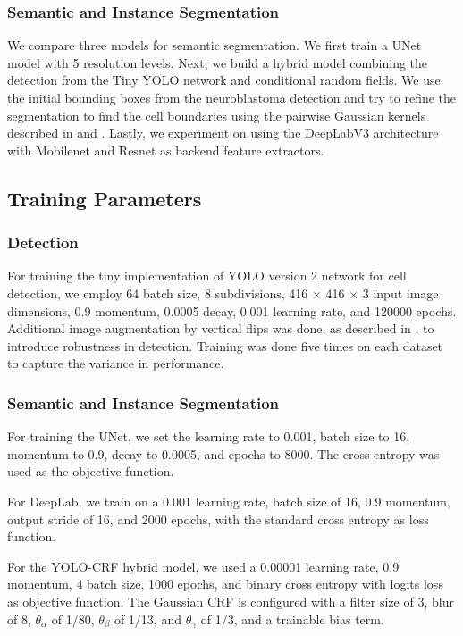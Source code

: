 \documentclass[journal]{IEEEtran}
\begin{document}
\subsubsection{Semantic and Instance Segmentation}
We compare three models for semantic segmentation. We first train a UNet model with 5 resolution levels. Next, we build a hybrid model combining the detection from the Tiny YOLO network and conditional random fields. We use the initial bounding boxes from the neuroblastoma detection and try to refine the segmentation to find the cell boundaries using the pairwise Gaussian kernels described in \cite{NIPS2011_4296} and \cite{Teichmann2018ConvolutionalCF}. Lastly, we experiment on using the DeepLabV3 architecture with Mobilenet and Resnet as backend feature extractors.
\subsection{Training Parameters}
\subsubsection{Detection}
For training the tiny implementation of YOLO version 2 network for cell detection, we employ 64 batch size, 8 subdivisions, 416 $\times$ 416 $\times$ 3 input image dimensions, 0.9 momentum, 0.0005 decay, 0.001 learning rate, and 120000 epochs. Additional image augmentation by vertical flips was done, as described in \cite{Waithe544833}, to introduce robustness in detection. Training was done five times on each dataset to capture the variance in performance.
\subsubsection{Semantic and Instance Segmentation}
For training the UNet, we set the learning rate to 0.001, batch size to 16, momentum to 0.9, decay to 0.0005, and epochs to 8000. The cross entropy was used as the objective function.

For DeepLab, we train on a 0.001 learning rate, batch size of 16, 0.9 momentum, output stride of 16, and 2000 epochs, with the standard cross entropy as loss function.

For the YOLO-CRF hybrid model, we used a 0.00001 learning rate, 0.9 momentum, 4 batch size, 1000 epochs, and binary cross entropy with logits loss as objective function. The Gaussian CRF is configured with a filter size of 3, blur of 8, $\theta_\alpha$ of 1/80, $\theta_\beta$ of 1/13, and $\theta_\gamma$ of 1/3, and a trainable bias term.
\end{document}

